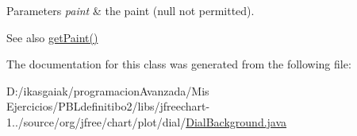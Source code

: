 \begin{DoxyParams}{Parameters}
{\em paint} & the paint ({\ttfamily null} not permitted).\\
\hline
\end{DoxyParams}
\begin{DoxySeeAlso}{See also}
\mbox{\hyperlink{classorg_1_1jfree_1_1chart_1_1plot_1_1dial_1_1_dial_background_a3ec700ecf1d9518ea4f6ae98bf8d97aa}{get\+Paint()}} 
\end{DoxySeeAlso}


The documentation for this class was generated from the following file\+:\begin{DoxyCompactItemize}
\item 
D\+:/ikasgaiak/programacion\+Avanzada/\+Mis Ejercicios/\+P\+B\+Ldefinitibo2/libs/jfreechart-\/1../source/org/jfree/chart/plot/dial/\mbox{\hyperlink{_dial_background_8java}{Dial\+Background.\+java}}\end{DoxyCompactItemize}
